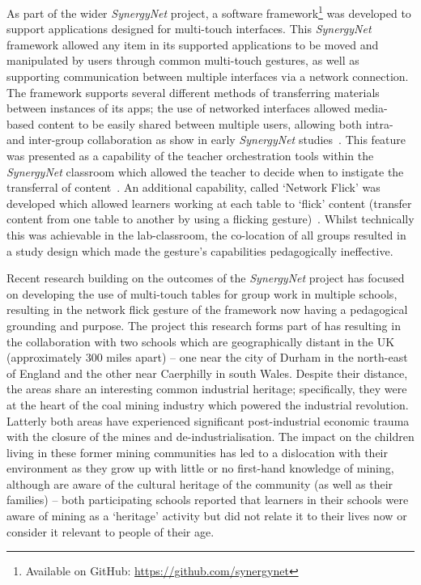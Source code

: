 \documentclass[a4paper,11pt]{article}
\begin{document}
As part of the wider {\emph{SynergyNet}} project, a software framework\footnote{Available on GitHub: \url{https://github.com/synergynet}} was developed to support applications designed for multi-touch interfaces.
This {\emph{SynergyNet}} framework allowed any item in its supported applications to be moved and manipulated by users through common multi-touch gestures, as well as supporting communication between multiple interfaces via a network connection.
The framework supports several different methods of transferring materials between instances of its apps; the use of networked interfaces allowed media-based content to be easily shared between multiple users, allowing both intra- and inter-group collaboration as show in early {\emph{SynergyNet}} studies~\cite{mercier:2014b}.
This feature was presented as a capability of the teacher orchestration tools within the {\emph{SynergyNet}} classroom which allowed the teacher to decide when to instigate the transferral of content~\cite{alagha-et-al:2010,mercier:2016}.
An additional capability, called `Network Flick' was developed which allowed learners working at each table to ‘flick’ content (transfer content from one table to another by using a flicking gesture)~\cite{reetz-et-al:2006}.
Whilst technically this was achievable in the lab-classroom, the co-location of all groups resulted in a study design which made the gesture’s capabilities pedagogically ineffective.

Recent research building on the outcomes of the {\emph{SynergyNet}} project has focused on developing the use of multi-touch tables for group work in multiple schools, resulting in the network flick gesture of the framework now having a pedagogical grounding and purpose.
The project this research forms part of has resulting in the collaboration with two schools which are geographically distant in the UK (approximately 300 miles apart) -- one near the city of Durham in the north-east of England and the other near Caerphilly in south Wales.
Despite their distance, the areas share an interesting common industrial heritage; specifically, they were at the heart of the coal mining industry which powered the industrial revolution.
Latterly both areas have experienced significant post-industrial economic trauma with the closure of the mines and de-industrialisation.
The impact on the children living in these former mining communities has led to a dislocation with their environment as they grow up with little or no first-hand knowledge of mining, although are aware of the cultural heritage of the community (as well as their families) -- both participating schools reported that learners in their schools were aware of mining as a ‘heritage’ activity but did not relate it to their lives now or consider it relevant to people of their age.
\end{document}
